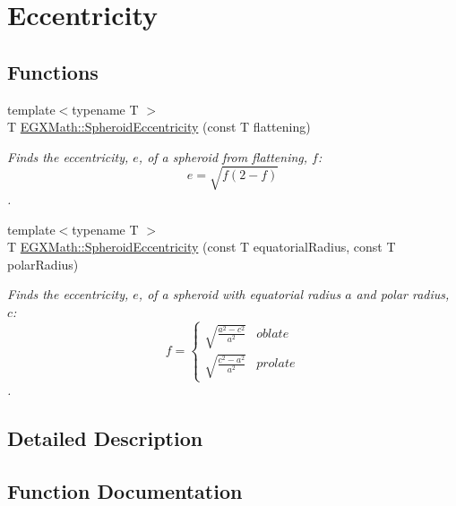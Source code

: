 \hypertarget{group___e_g_x_math-_geometry-3_d-_spheroid-_eccentricity}{}\section{Eccentricity}
\label{group___e_g_x_math-_geometry-3_d-_spheroid-_eccentricity}
\subsection*{Functions}
\begin{DoxyCompactItemize}
\item 
{\footnotesize template$<$typename T $>$ }\\T \mbox{\hyperlink{group___e_g_x_math-_geometry-3_d-_spheroid-_eccentricity_gab45680528a41bb7a5e15ddc0059156dd}{E\+G\+X\+Math\+::\+Spheroid\+Eccentricity}} (const T flattening)
\begin{DoxyCompactList}\small\item\em Finds the eccentricity, $e$, of a spheroid from flattening, $f$\+: \[ e = \sqrt{f (2 - f)} \]. \end{DoxyCompactList}\item 
{\footnotesize template$<$typename T $>$ }\\T \mbox{\hyperlink{group___e_g_x_math-_geometry-3_d-_spheroid-_eccentricity_gab4c867532eef5a52e8e575e2a6b18bf8}{E\+G\+X\+Math\+::\+Spheroid\+Eccentricity}} (const T equatorial\+Radius, const T polar\+Radius)
\begin{DoxyCompactList}\small\item\em Finds the eccentricity, $e$, of a spheroid with equatorial radius $a$ and polar radius, $c$\+: \[ f =\begin{cases} \sqrt{\frac{a^2-c^2}{a^2}} & oblate \\ \sqrt{\frac{c^2-a^2}{a^2}} & prolate \end{cases} \]. \end{DoxyCompactList}\end{DoxyCompactItemize}


\subsection{Detailed Description}


\subsection{Function Documentation}
\mbox{\label{group___e_g_x_math-_geometry-3_d-_spheroid-_eccentricity_gab45680528a41bb7a5e15ddc0059156dd}} 
